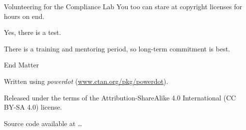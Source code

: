 \documentclass[
  size=12pt,
  style=simple,
  paper=screen
]{powerdot}
\begin{document}
\begin{wideslide}{Volunteering for the Compliance Lab}
  You too can stare at copyright licenses for hours on end.
  \pp

  \begin{itemize}
    \setlength{\itemsep}{1em}

    \nitem Yes, there is a test.

    \pp

    \nitem There is a training and mentoring period, so long-term
    commitment is best.

  \end{itemize}
\end{wideslide}

\begin{wideslide}{End Matter}
  \begin{itemize}
    \setlength{\itemsep}{1em}

    \sitem Written using \emph{powerdot}
    (\url{www.ctan.org/pkg/powerdot}).

    \sitem Released under the terms of the Attribution-ShareAlike 4.0
    International (CC BY-SA 4.0) license.

    \sitem Source code available at \ldots

  \end{itemize}
\end{wideslide}
\end{document}
